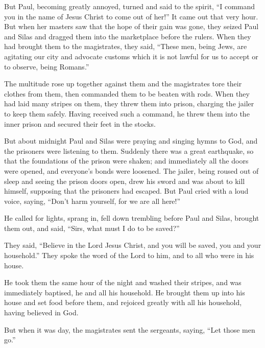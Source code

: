 But Paul, becoming greatly annoyed, turned and said to the spirit, ``I
command you in the name of Jesus Christ to come out of her!'' It came
out that very hour.  But when her masters saw that the
hope of their gain was gone, they seized Paul and Silas and dragged them
into the marketplace before the rulers.  When they had
brought them to the magistrates, they said, ``These men, being Jews, are
agitating our city  and advocate customs which it is not
lawful for us to accept or to observe, being Romans.''

 The multitude rose up together against them and the
magistrates tore their clothes from them, then commanded them to be
beaten with rods.  When they had laid many stripes on
them, they threw them into prison, charging the jailer to keep them
safely.  Having received such a command, he threw them
into the inner prison and secured their feet in the stocks.

 But about midnight Paul and Silas were praying and
singing hymns to God, and the prisoners were listening to them.
 Suddenly there was a great earthquake, so that the
foundations of the prison were shaken; and immediately all the doors
were opened, and everyone's bonds were loosened.  The
jailer, being roused out of sleep and seeing the prison doors open, drew
his sword and was about to kill himself, supposing that the prisoners
had escaped.  But Paul cried with a loud voice, saying,
``Don't harm yourself, for we are all here!''

 He called for lights, sprang in, fell down trembling
before Paul and Silas,  brought them out, and said,
``Sirs, what must I do to be saved?''

 They said, ``Believe in the Lord Jesus Christ, and you
will be saved, you and your household.''  They spoke the
word of the Lord to him, and to all who were in his house.

 He took them the same hour of the night and washed their
stripes, and was immediately baptised, he and all his household.
 He brought them up into his house and set food before
them, and rejoiced greatly with all his household, having believed in
God.

 But when it was day, the magistrates sent the sergeants,
saying, ``Let those men go.''

